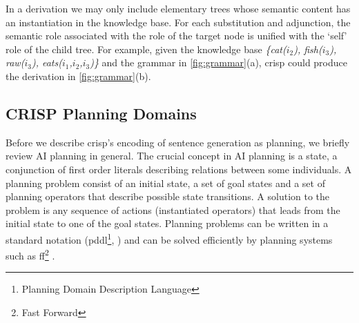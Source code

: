 In a derivation we may only include elementary trees whose semantic content has an instantiation in the knowledge base. For each substitution and adjunction, the semantic role associated with the role of the target node is unified with the `self' role of the child tree. For example, given the knowledge base 
{\it \{cat($i_2$), fish($i_3$), raw($i_3$), eats($i_1$,$i_2$,$i_3$)\}} and the grammar in \ref{fig:grammar}(a), {\sc crisp} could produce the derivation in \ref{fig:grammar}(b).


\subsection{CRISP Planning Domains} 
\label{ssec:crispdomain}
Before we describe {\sc crisp}'s encoding of sentence generation as planning, we briefly review AI planning in general. 
The crucial concept in AI planning is a state, a conjunction of first order literals describing relations between some individuals. A planning problem consist of an initial state, a set of goal states and a set of planning operators that describe possible state transitions.  A solution to the problem is any sequence of actions (instantiated operators) that leads from the initial state to one of the goal states. Planning problems can be written in a standard notation ({\sc pddl}\footnote{Planning Domain Description Language}, ) and can be solved efficiently by planning systems such as {\sc ff}\footnote{Fast Forward} \cite{hoffmannnebel2001}.  
     
